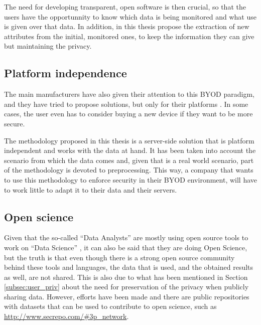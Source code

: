 The need for developing transparent, open software is then crucial, so that the users have the opportunnity to know which data is being monitored and what use is given over that data. In addition, in this thesis propose the extraction of new attributes from the initial, monitored ones, to keep the information they can give but maintaining the privacy.

\subsection{Platform independence}
\label{subsec:platf_ind}

The main manufacturers have also given their attention to this BYOD paradigm, and they have tried to propose solutions, but only for their platforms \cite{de2015corporate}. In some cases, the user even has to consider buying a new device if they want to be more secure.

The methodology proposed in this thesis is a server-side solution that is platform independent and works with the data at hand. It has been taken into account the scenario from which the data comes and, given that is a real world scenario, part of the methodology is devoted to preprocessing. This way, a company that wants to use this methodology to enforce security in their BYOD environment, will have to work little to adapt it to their data and their servers.

\subsection{Open science}
\label{subsec:openS}

Given that the so-called ``Data Analysts'' are mostly using open source tools to work on ``Data Science'' \cite{OS_toptools, ML_popularlang}, it can also be said that they are doing Open Science, but the truth is that even though there is a strong open source community behind these tools and languages, the data that is used, and the obtained results as well, are not shared. This is also due to what has been mentioned in Section \ref{subsec:user_priv} about the need for preservation of the privacy when publicly sharing data. However, efforts have been made and there are public repositories with datasets that can be used to contribute to open science, such as \url{http://www.secrepo.com/#3p\_network}.

